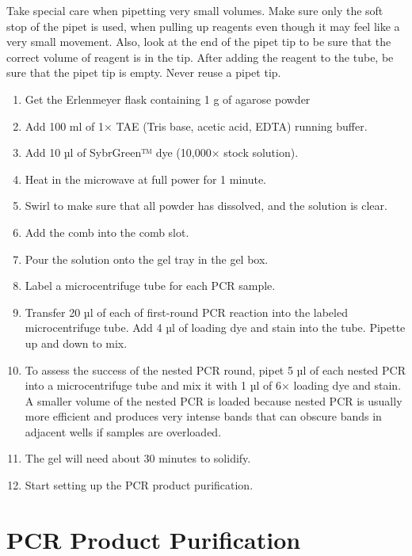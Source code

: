\documentclass[]{book}
\providecommand{\tightlist}{%
  \setlength{\itemsep}{0pt}\setlength{\parskip}{0pt}}
\theoremstyle{definition}
\theoremstyle{definition}
\theoremstyle{definition}
\theoremstyle{remark}
\let\BeginKnitrBlock\begin \let\EndKnitrBlock\end
\begin{document}
\BeginKnitrBlock{rmdnote}
Take special care when pipetting very small volumes. Make sure only the
soft stop of the pipet is used, when pulling up reagents even though it
may feel like a very small movement. Also, look at the end of the pipet
tip to be sure that the correct volume of reagent is in the tip. After
adding the reagent to the tube, be sure that the pipet tip is empty.
Never reuse a pipet tip.
\EndKnitrBlock{rmdnote}

\begin{enumerate}
\def\labelenumi{\arabic{enumi}.}
\setcounter{enumi}{1}
\tightlist
\item
  Get the Erlenmeyer flask containing 1 g of agarose powder
\item
  Add 100 ml of 1× TAE (Tris base, acetic acid, EDTA) running buffer.
\item
  Add 10 µl of SybrGreen™ dye (10,000× stock solution).
\item
  Heat in the microwave at full power for 1 minute.
\item
  Swirl to make sure that all powder has dissolved, and the solution is
  clear.
\item
  Add the comb into the comb slot.
\item
  Pour the solution onto the gel tray in the gel box.
\item
  Label a microcentrifuge tube for each PCR sample.
\item
  Transfer 20 µl of each of first-round PCR reaction into the labeled
  microcentrifuge tube. Add 4 µl of loading dye and stain into the tube.
  Pipette up and down to mix.
\item
  To assess the success of the nested PCR round, pipet 5 µl of each
  nested PCR into a microcentrifuge tube and mix it with 1 µl of 6×
  loading dye and stain. A smaller volume of the nested PCR is loaded
  because nested PCR is usually more efficient and produces very intense
  bands that can obscure bands in adjacent wells if samples are
  overloaded.
\item
  The gel will need about 30 minutes to solidify.
\item
  Start setting up the PCR product purification.
\end{enumerate}

\section{PCR Product Purification}\label{pcr-product-purification}
\end{document}
